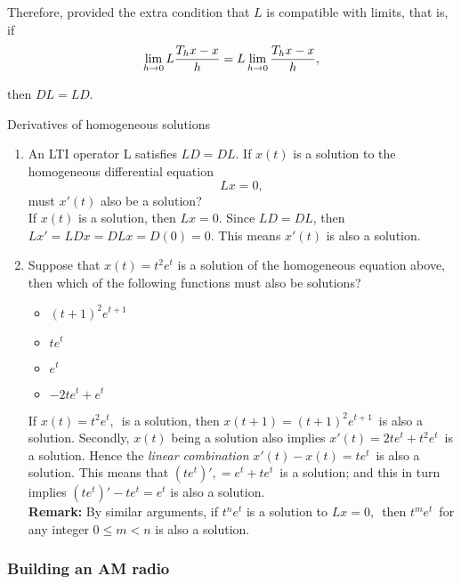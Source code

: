 Therefore, provided the extra condition that $L$ is compatible with limits,
that is, if
\begin{equation*}
  \displaystyle  \displaystyle \lim _{h\to 0} L \frac{T_ h x-x}{h}
  \displaystyle =
  \displaystyle L \lim _{h\to 0} \frac{T_ h x-x}{h},
\end{equation*}

then $DL = LD$.

\begin{problem}
  Derivatives of homogeneous solutions
\end{problem}

\begin{enumerate}
\item An LTI operator L satisfies $LD=DL$.
  If $x(t)$ is a solution to the homogeneous differential equation
  \begin{equation*}
    L x = 0,
  \end{equation*}
  must $x′(t)$ also be a solution?\\

  If $x(t)$ is a solution,
  then $Lx=0$. Since $LD=DL$, then $Lx′=LDx=DLx=D(0)=0$. 
  This means $x′(t)$ is also a solution.
\item Suppose that $x(t)=t^2e^t$ is a solution of the homogeneous equation above,
  then which of the following functions must also be solutions?
  \begin{itemize}
  \item $(t+1)^2 e^{t+1}$
  \item $te^t$
  \item $e^t$
  \item $-2te^t + e^t$
  \end{itemize}

  If $x(t)=t^2e^{t},\,$ is a solution,
  then $x(t+1)=(t+1)^2 e^{t+1}\,$ is also a solution.
  Secondly, $x(t)$ being a solution also implies $x′(t) = 2te^t + t^2e^t\,$ is a solution.
  Hence the \emph{linear combination} $x′(t) − x(t) =te^t\,$ is also a solution.
  This means that $(te^t)′,= e^t+te^t\,$ is a solution;
  and this in turn implies $(te^t)′− te^t=e^t$ is also a solution.\\

  \textbf{Remark:} By similar arguments, if $t^n e^t$
  is a solution to $Lx=0,\,$ then $t^me^t\,$ for any integer $0\leq m<n$ is also a solution.

\end{enumerate}

\clearpage
\subsubsection{Building an AM radio}

